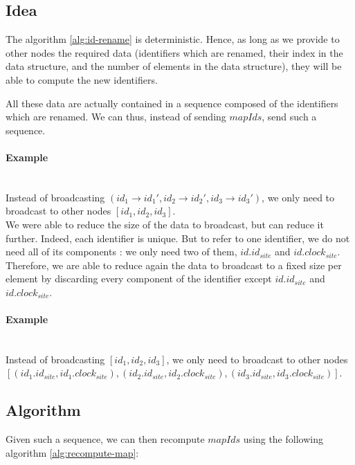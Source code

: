 \documentclass[a4paper]{article}
\begin{document}
\subsection{Idea}

The algorithm \ref{alg:id-rename} is deterministic. Hence, as long as we provide
to other nodes the required data (identifiers which are renamed,
their index in the data structure, and the number of elements in the data structure),
they will be able to compute the new identifiers.

All these data are actually contained in a sequence composed of the identifiers
which are renamed. We can thus, instead of sending $mapIds$, send such a sequence.

\paragraph{Example}~\\

Instead of broadcasting $(id_1 \rightarrow id_1', id_2 \rightarrow id_2', id_3 \rightarrow id_3')$,
we only need to broadcast to other nodes $[id_1, id_2, id_3]$.\\

We were able to reduce the size of the data to broadcast, but can reduce it further.
Indeed, each identifier is unique. But to refer to one identifier, we do not
need all of its components : we only need two of them, $id.id_{site}$ and $id.clock_{site}$.
Therefore, we are able to reduce again the data to broadcast to a fixed size per element
by discarding every component of the identifier except $id.id_{site}$ and $id.clock_{site}$.

\paragraph{Example}~\\

Instead of broadcasting $[id_1, id_2, id_3]$,
we only need to broadcast to other nodes
$[(id_1.id_{site}, id_1.clock_{site}),
(id_2.id_{site}, id_2.clock_{site}),
(id_3.id_{site}, id_3.clock_{site})]$.

\subsection{Algorithm}

Given such a sequence, we can then recompute $mapIds$
using the following algorithm \ref{alg:recompute-map}:
\end{document}
